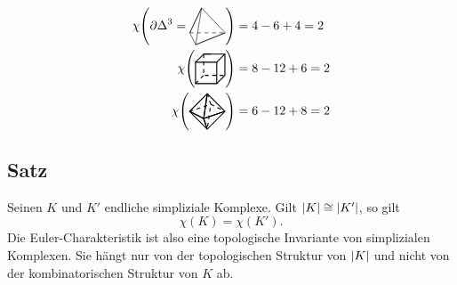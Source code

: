 \begin{align*}
	\chi \enbrace*{\partial \Delta^3 = \vcenter{\hbox{\begin{tikzpicture}
			\coordinate (0) at (0,0);
			\coordinate (1) at (1,0);
			\coordinate (2) at (0.5,0,0.866);
			\coordinate (3) at (0.5,0.866,0.433);
			\draw[sharp corners, dashed] (0) -- (1);
			\draw[sharp corners] (1) -- (2) -- (0) -- (3) -- (2) -- (1) -- (3) -- (0);
		\end{tikzpicture}}} } &= 4 - 6 +4 = 2 \\
	\chi\enbrace[\Bigg]{ \vcenter{\hbox{\begin{tikzpicture}
		\coordinate (0) at (0,0,-0.6);
		\coordinate (1) at (0.6,0,-0.6);
		\coordinate (2) at (0.6,0.6,-0.6);
		\coordinate (3) at (0,0.6,-0.6);
		\draw[thick, dashed] (3) -- (0) -- (1);
		\draw[thick] (1) -- (2) -- (3);
		\draw[thick, dashed] (0,0) -- (0);
		\draw[thick] (0.6,0) -- (0.6,0,-0.6);
		\draw[thick] (0.6,0.6) -- (0.6,0.6,-0.6);
		\draw[thick] (0,0.6) -- (0,0.6,-0.6) -- ++ (0.2,0);
		\draw[thick] (0,0) rectangle (0.6,0.6);
	\end{tikzpicture}}} } &= 8 -12 +6 = 2 \\
	\chi \enbrace*{ \vcenter{\hbox{\begin{tikzpicture}
		\coordinate (A1) at (0,0);
		\coordinate (A2) at (0.6,0.2);
		\coordinate (A3) at (1,0);
		\coordinate (A4) at (0.4,-0.2);
		\coordinate (B1) at (0.5,0.5);
		\coordinate (B2) at (0.5,-0.5);
		\begin{scope}[thick,dashed,]
		\draw (A1) -- (A2) -- (A3);
		\draw (B1) -- (A2) -- (B2);
		\end{scope}
		\begin{scope}[thick]
		\draw[] (A1) -- (A4) -- (B1);
		\draw[] (A1) -- (A4) -- (B2);
		\draw[] (A3) -- (A4) -- (B1);
		\draw[] (A3) -- (A4) -- (B2);
		\draw (B1) -- (A1) -- (B2) -- (A3) --cycle;
		\end{scope}
	\end{tikzpicture}}} } &= 6- 12  +8 = 2 
\end{align*}

\subsection[Satz über die Euler-Charakteristik]{Satz} %
\label{sub:210}
Seinen $K$ und $K'$ endliche simpliziale Komplexe. Gilt $\abs*{K} \cong \abs*{K'}$, so gilt 
\[
	\chi(K)= \chi(K').
\]
Die Euler-Charakteristik ist also eine topologische Invariante von simplizialen Komplexen. Sie hängt nur von der topologischen Struktur von $\abs*{K}$ und nicht
von der kombinatorischen Struktur von $K$ ab.
\newpage


